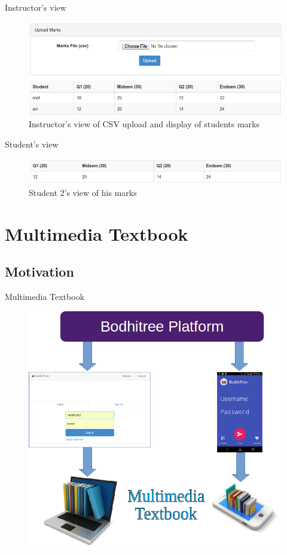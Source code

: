 \documentclass{beamer}
\begin{document}
\begin{frame}{Instructor's view}
	\begin{figure}
	\centering
	\includegraphics[width=0.8\linewidth]{media/marksi}
	\caption{Instructor's view of CSV upload and display of students marks}
	\label{fig:marksi}
	\end{figure}
\end{frame}

\begin{frame}{Student's view}
	\begin{figure}
		\centering
		\includegraphics[width=0.8\linewidth]{media/markss1}
		\caption{Student 2's view of his marks}
		\label{fig:markss1}
	\end{figure}
\end{frame}

\section{Multimedia Textbook}

\subsection{Motivation}

\begin{frame}{Multimedia Textbook}
	\begin{figure}
		\centering
		\includegraphics[width=0.6\linewidth]{media/bmmt}
		\label{fig:bmmt}
	\end{figure}
\end{frame}
\end{document}
